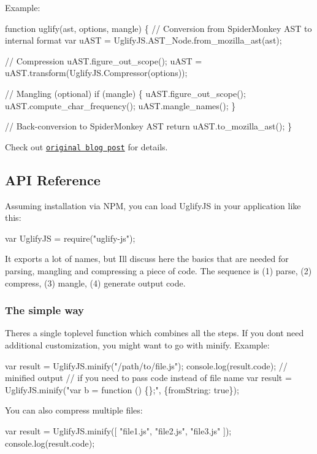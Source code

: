 Example\+:


\begin{DoxyCode}
function uglify(ast, options, mangle) \{
  // Conversion from SpiderMonkey AST to internal format
  var uAST = UglifyJS.AST\_Node.from\_mozilla\_ast(ast);

  // Compression
  uAST.figure\_out\_scope();
  uAST = uAST.transform(UglifyJS.Compressor(options));

  // Mangling (optional)
  if (mangle) \{
    uAST.figure\_out\_scope();
    uAST.compute\_char\_frequency();
    uAST.mangle\_names();
  \}

  // Back-conversion to SpiderMonkey AST
  return uAST.to\_mozilla\_ast();
\}
\end{DoxyCode}


Check out \href{http://rreverser.com/using-mozilla-ast-with-uglifyjs/}{\tt original blog post} for details.

\subsection*{A\+PI Reference }

Assuming installation via N\+PM, you can load Uglify\+JS in your application like this\+: 
\begin{DoxyCode}
var UglifyJS = require("uglify-js");
\end{DoxyCode}


It exports a lot of names, but I\textquotesingle{}ll discuss here the basics that are needed for parsing, mangling and compressing a piece of code. The sequence is (1) parse, (2) compress, (3) mangle, (4) generate output code.

\subsubsection*{The simple way}

There\textquotesingle{}s a single toplevel function which combines all the steps. If you don\textquotesingle{}t need additional customization, you might want to go with {\ttfamily minify}. Example\+: 
\begin{DoxyCode}
var result = UglifyJS.minify("/path/to/file.js");
console.log(result.code); // minified output
// if you need to pass code instead of file name
var result = UglifyJS.minify("var b = function () \{\};", \{fromString: true\});
\end{DoxyCode}


You can also compress multiple files\+: 
\begin{DoxyCode}
var result = UglifyJS.minify([ "file1.js", "file2.js", "file3.js" ]);
console.log(result.code);
\end{DoxyCode}


